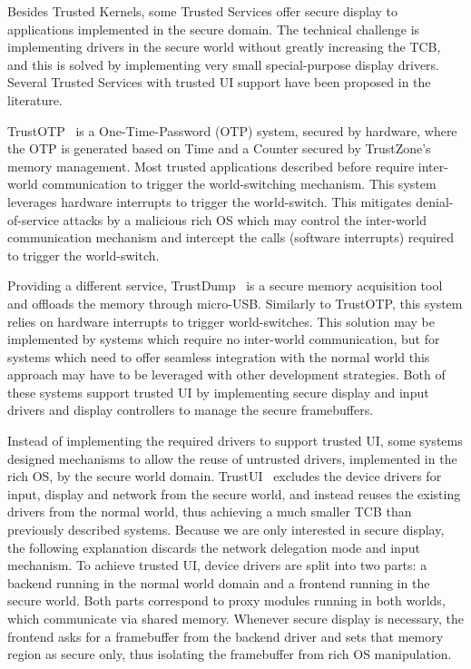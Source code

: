 Besides Trusted Kernels, some Trusted Services offer secure display to applications implemented in the secure domain. The technical challenge is implementing drivers in the secure world without greatly increasing the TCB, and this is solved by implementing very small special-purpose display drivers. Several Trusted Services with trusted UI support have been proposed in the literature.

TrustOTP~\cite{sun2015trustotp} is a One-Time-Password (OTP) system, secured by hardware, where the OTP is generated based on Time and a Counter secured by TrustZone's memory management. Most trusted applications described before require inter-world communication to trigger the world-switching mechanism. This system leverages hardware interrupts to trigger the world-switch. This mitigates denial-of-service attacks by a malicious rich OS which may control the inter-world communication mechanism and intercept the calls (software interrupts) required to trigger the world-switch. 

Providing a different service, TrustDump~\cite{sun2015reliable} is a secure memory acquisition tool and offloads the memory through micro-USB. Similarly to TrustOTP, this system relies on hardware interrupts to trigger world-switches. This solution may be implemented by systems which require no inter-world communication, but for systems which need to offer seamless integration with the normal world this approach may have to be leveraged with other development strategies. Both of these systems support trusted UI by implementing secure display and input drivers and display controllers to manage the secure framebuffers.

Instead of implementing the required drivers to support trusted UI, some systems designed mechanisms to allow the reuse of untrusted drivers, implemented in the rich OS, by the secure world domain. TrustUI~\cite{li2014building} excludes the device drivers for input, display and network from the secure world, and instead reuses the existing drivers from the normal world, thus achieving a much smaller TCB than previously described systems. Because we are only interested in secure display, the following explanation discards the network delegation mode and input mechanism. To achieve trusted UI, device drivers are split into two parts: a backend running in the normal world domain and a frontend running in the secure world. Both parts correspond to proxy modules running in both worlds, which communicate via shared memory. Whenever secure display is necessary, the frontend asks for a framebuffer from the backend driver and sets that memory region as secure only, thus isolating the framebuffer from rich OS manipulation. 

